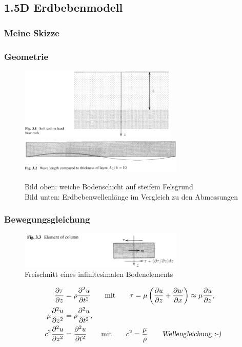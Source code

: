 \subsection{1.5D Erdbebenmodell}

\begin{frame}
\frametitle{Meine Skizze}


\end{frame}

\begin{frame}
\frametitle{Geometrie}

\begin{figure}
\includegraphics[width=0.67\textwidth]{fig_pdf/earthquake_model}
\includegraphics[width=0.7\textwidth]{fig_pdf/earthquake_length_ratio}
\caption*{Bild oben: weiche Bodenschicht auf steifem Felsgrund\\ Bild unten: Erdbebenwellenlänge im Vergleich zu den Abmessungen \cite{Verruijt2010}}
\end{figure}
\end{frame}

\begin{frame}
\frametitle{Bewegungsgleichung}
\begin{figure}
\includegraphics[width=0.7\textwidth]{fig_pdf/earthquake_inf_element}
\caption*{Freischnitt eines infinitesimalen Bodenelements \cite{Verruijt2010}}
\end{figure}
\begin{align*}
 \frac{\partial \tau}{\partial z} &= \rho \frac{\partial^2 u}{\partial t^2}
 \qquad \text{mit} \qquad \tau=\mu \left(\frac{\partial u}{\partial z} +  \frac{\partial w}{\partial x} \right)\approx \mu \frac{\partial u}{\partial z},\\
 \mu \frac{\partial^2 u}{\partial z^2} &= \rho \frac{\partial^2 u}{\partial t^2},\\
 c^2\frac{\partial^2 u}{\partial z^2} &= \frac{\partial^2 u}{\partial t^2}
 \qquad \text{mit} \qquad c^2=\frac{\mu}{\rho}  \qquad \text{\textsl{Wellengleichung :-)}}
\end{align*}
\end{frame}


